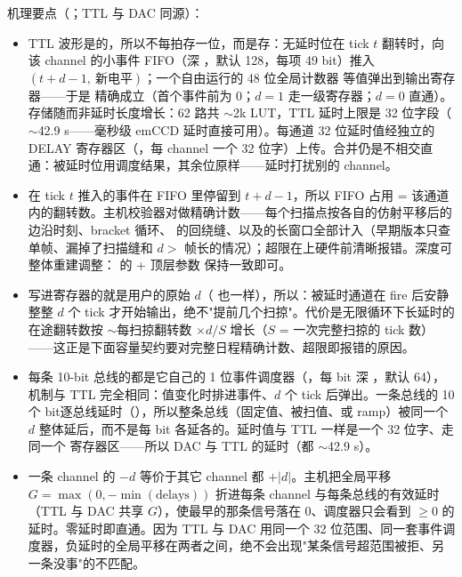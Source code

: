 \documentclass[11pt,oneside,openany]{book}
\begin{document}
机理要点（；TTL 与 DAC 同源）：
\begin{itemize}
  \item {} TTL 波形是的，所以不每拍存一位，而是存：无延时位在 tick $t$ 翻转时，向该 channel 的小事件 FIFO（深 ，默认 128，每项 49 bit）推入 $(t+d-1,\ \text{新电平})$；一个自由运行的 48 位全局计数器  等值弹出到输出寄存器——于是  精确成立（首个事件前为 0；$d=1$ 走一级寄存器；$d=0$ 直通）。存储随而非延时长度增长：62 路共 $\sim$2k LUT，TTL 延时上限是 32 位字段（$\sim$42.9 s——毫秒级 emCCD 延时直接可用）。每通道 32 位延时值经独立的 DELAY 寄存器区（，每 channel 一个 32 位字）上传。合并仍是不相交直通：被延时位用调度结果，其余位原样——延时打扰别的 channel。
  \item {} 在 tick $t$ 推入的事件在 FIFO 里停留到 $t+d-1$，所以 FIFO 占用 = 该通道内的翻转数。主机校验器对做精确计数——每个扫描点按各自的仿射平移后的边沿时刻、bracket 循环、 的回绕缝、以及的长窗口全部计入（早期版本只查单帧、漏掉了扫描缝和 $d>$ 帧长的情况）；超限在上硬件前清晰报错。深度可整体重建调整： 的  + 顶层参数  保持一致即可。
  \item {} 写进寄存器的就是用户的原始 $d$（ 也一样），所以：被延时通道在 fire 后安静整整 $d$ 个 tick 才开始输出，绝不"提前几个扫掠"。代价是无限循环下长延时的在途翻转数按 $\sim$每扫掠翻转数 $\times d/S$ 增长（$S$ = 一次完整扫掠的 tick 数）——这正是下面容量契约要对完整日程精确计数、超限即报错的原因。
  \item {} 每条 10-bit 总线的都是它自己的 1 位事件调度器（，每 bit 深 ，默认 64），机制与 TTL 完全相同：值变化时排进事件、$d$ 个 tick 后弹出。一条总线的 10 个 bit逐总线延时（），所以整条总线（固定值、被扫值、或 ramp）被同一个 $d$ 整体延后，而不是每 bit 各延各的。延时值与 TTL 一样是一个 32 位字、走同一个  寄存器区——所以 DAC 与 TTL 的延时（都 $\sim$42.9 s）。
  \item {} 一条 channel 的 $-d$ 等价于其它 channel 都 $+|d|$。主机把全局平移 $G=\max(0,-\min(\text{delays}))$ 折进每条 channel 与每条总线的有效延时（TTL 与 DAC 共享 $G$），使最早的那条信号落在 0、调度器只会看到 $\ge 0$ 的延时。零延时即直通。因为 TTL 与 DAC 用同一个 32 位范围、同一套事件调度器，负延时的全局平移在两者之间，绝不会出现"某条信号超范围被拒、另一条没事"的不匹配。

\end{itemize}
\end{document}
